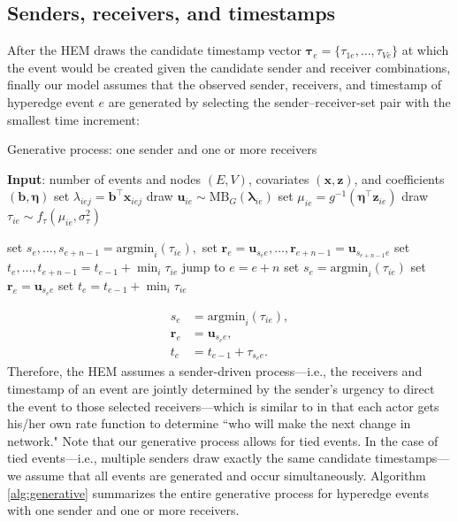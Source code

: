 \documentclass[ba]{imsart}
\def\spacingset#1{\renewcommand{\baselinestretch}%
	{#1}\small\normalsize} \spacingset{1}
\numberwithin{equation}{section}
\theoremstyle{plain}
\begin{document}
	\subsection{Senders, receivers, and timestamps}\label{subsec:Observed}
		After the HEM draws the candidate timestamp vector $\boldsymbol{\tau}_e=\{\tau_{1e},\ldots,\tau_{Ve}\}$ at which the event would be created given the candidate sender and receiver combinations, finally our model assumes that the observed sender, receivers, and timestamp of hyperedge event $e$ are generated by selecting the sender--receiver-set pair with the smallest time increment:
			\begin{algorithm}[!t]
				\spacingset{1}
				\SetAlgoLined
				\caption{Generative process: one sender and one or more receivers}
				\begin{algorithmic}
					\STATE \textbf{Input}: number of events and nodes $(E, V)$, covariates $(\boldsymbol{x}, \boldsymbol{z})$, and coefficients $(\boldsymbol{b}, \boldsymbol{\eta})$
					\vskip 0.1in
					\STATE	set $\lambda_{iej} = {\boldsymbol{b}}^{\top}\boldsymbol{x}_{iej}$
					\ENDFOR
					\STATE	draw $\boldsymbol{u}_{ie}  \sim
					\mbox{MB}_G(\boldsymbol{\lambda}_{ie})$
					\STATE		set $\mu_{ie} = g^{-1}(\boldsymbol{\eta}^\top \boldsymbol{z}_{ie})$
					\STATE		draw $\tau_{ie} \sim f_\tau(\mu_{ie}, \sigma_\tau^2)$
					\ENDFOR
					
					\STATE	set $s_e,\ldots, s_{e+n-1}=\mbox{argmin}_{i}(\tau_{ie}),$
					\STATE	set $\boldsymbol{r}_e=\boldsymbol{u}_{s_e e},\ldots,\boldsymbol{r}_{e+n-1}=\boldsymbol{u}_{s_{e+n-1} e}$
					\STATE	set $t_e, \ldots, t_{e+n-1}=t_{e-1} + \min_i\tau_{ie}$
					\STATE		jump to $e = e+n$
					\ELSE
					\STATE	set $s_e= \mbox{argmin}_{i}(\tau_{ie})$
					\STATE		set $\boldsymbol{r}_e = \boldsymbol{u}_{s_e e}$
					\STATE	set $t_e =t_{e-1} + \min_i\tau_{ie}$
					\ENDIF
					\ENDFOR
				\end{algorithmic}
				\label{alg:generative}
			\end{algorithm}
	\begin{equation}
		\begin{aligned}
			s_e &= \mbox{argmin}_{i}(\tau_{ie}),\\
			\boldsymbol{r}_e &= \boldsymbol{u}_{s_e e},\\
			t_e &=t_{e-1} + \tau_{s_e e}.
		\end{aligned}
	\end{equation}
		Therefore, the HEM assumes a sender-driven process---i.e., the receivers and timestamp of an event are jointly determined by the sender's urgency to direct the event to those selected receivers---which is similar to \cite{snijders1996stochastic} in that each actor gets his/her own rate function to determine ``who will make the next change in network." Note that our generative process allows for tied events. In the case of tied events---i.e., multiple senders draw exactly the same candidate timestamps---we assume that all events are generated and occur simultaneously. Algorithm \ref{alg:generative} summarizes the entire generative process for hyperedge events with one sender and one or more receivers.     ~	
\end{document}
